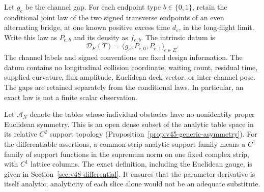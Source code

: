 Let $g_e$ be the channel gap.  For each endpoint type $b\in\{0,1\}$,
retain the conditional joint law of the two signed transverse endpoints
of an even alternating bridge, at one known positive excess time $d_e$,
in the long-flight limit.  Write this law as $P_{e,b}$ and its density as
$f_{e,b}$.  The intrinsic datum is
\begin{equation}\label{eq:v48-datum}
       \mathcal D_E(T)=\bigl(g_e,P_{e,0},P_{e,1}\bigr)_{e\in E}.
\end{equation}
The channel labels and signed conventions are fixed design information.
The datum contains no longitudinal collision coordinate, waiting count,
residual time, supplied curvature, flux amplitude, Euclidean deck vector,
or inter-channel pose.  The gaps are retained separately from the
conditional laws.  In particular, an exact law is not a finite scalar
observation.

Let $\mathscr A_N$ denote the tables whose individual obstacles have no
nonidentity proper Euclidean symmetry.  This is an open dense subset of
the analytic table space in its relative $C^2$ support topology
(Proposition~\ref{prop:v45-generic-asymmetry}).  For the differentiable
assertions, a common-strip analytic-support family means a $C^1$ family
of support functions in the supremum norm on one fixed complex strip,
with $C^1$ lattice columns.  The exact definition, including the Euclidean
gauge, is given in Section~\ref{sec:v48-differential}.  It ensures that
the parameter derivative is itself analytic; analyticity of each slice
alone would not be an adequate substitute.

